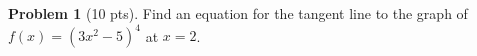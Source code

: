 \documentclass[12pt]{article}
\theoremstyle{definition}
\newtheorem{problem}{Problem}
\begin{document}
\begin{problem}[10 pts]
  Find an equation for the tangent line to the graph of $f(x) = (3x^2-5)^4$ at $x=2$.

  \vspace{5cm} 

  \begin{flushright}
  \end{flushright}
\end{problem}
\end{document}
